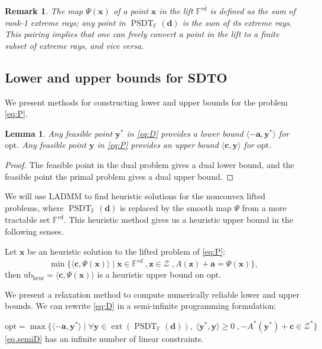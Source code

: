 \documentclass[smallextended]{svjour3}
\newtheorem{lemma}{Lemma}
\newtheorem{remark}{Remark}
\newcommand{\F}{\mathbb F}
\newcommand{\cZ}{\mathcal Z}
\DeclareMathOperator{\SOST}{PSDT}
\newcommand{\1}{\mathbf{1}}
\newcommand{\x}{\mathbf{x}}
\newcommand{\y}{\mathbf{y}}
\newcommand{\z}{\mathbf{z}}
\newcommand{\bc}{\mathbf{c}}
\renewcommand{\a}{\mathbf{a}}
\newcommand{\opt}{\text{opt}}
\newcommand{\heur}{\text{heur}}
\newcommand{\ub}{\text{ub}}
\DeclareMathOperator{\ext}{ext}
\newcommand{\inner}[2]{\langle #1, #2 \rangle}
\newcommand{\vc}[1]{\mathbf{#1}}
\newcommand{\vd}{\vc{d}}
\begin{document}
\begin{remark}
    \label{rmk.pair}
    The map $\Psi(\x)$ of a point $\x$ in the lift   $\F^{r\bar{d}}$ is defined as the sum of rank-1 extreme rays;  any point in  $\SOST_{\F}(\vd)$ is the sum of its extreme rays. This pairing implies that one can freely convert a point in the lift to a finite subset of extreme rays, and vice versa.
\end{remark}

\subsection{Lower and upper bounds for SDTO}
We present methods for constructing lower and upper bounds for the problem \eqref{eq:P}.


    \begin{lemma}
Any feasible point $\y^*$ in \eqref{eq:D} provides a lower bound $\inner{-\a}{\y^*}$ for $\opt$. Any feasible point $\y$ in \eqref{eq:P} provides an upper bound $\inner{\bc}{\y}$ for $\opt$.
\end{lemma}
\begin{proof}
    The feasible point in the dual problem gives a dual lower  bound, and the feasible point the primal problem gives a dual upper bound.
\end{proof}
We will use LADMM to find heuristic solutions for the nonconvex lifted problems,  where $\SOST_{\F}(\vd)$ is replaced by the smooth map $\Psi$ from a more tractable set $\F^{r\bar{d}}$. This heuristic method gives us a heuristic upper bound in the following senses.

Let $\x$ be an heuristic solution to the lifted problem of \eqref{eq:P}:
\begin{equation}
   \label{eq.LSDT} \tag{LSDTO}
    \min\{\inner{\bc}{\Psi(\x)} \mid \x \in \F^{r\bar{d}}   \;, \z \in \cZ \;,  A(\z) + \a  = \Psi(\x) \},
\end{equation} then $\ub_{\heur} = \inner{\bc}{\Psi(\x)}$ is a heuristic upper bound on $\opt$.

We present a relaxation method to compute numerically reliable lower and upper bounds.
We can rewrite \eqref{eq:D} in a semi-infinite programming formulation:

\begin{equation}
    \label{eq.semiD} \tag{SemiDSDTO}
   \opt= \max \{\inner{-\a}{\y^*} \mid \forall \y \in \ext(\SOST_{\F}(\vd)),\;  \inner{\y^\ast}{\y} \ge 0  \;,   - A^*(\y^*) + \bc\in \cZ^* \}
\end{equation}
\eqref{eq.semiD} has an infinite number of linear constraints.
\end{document}
